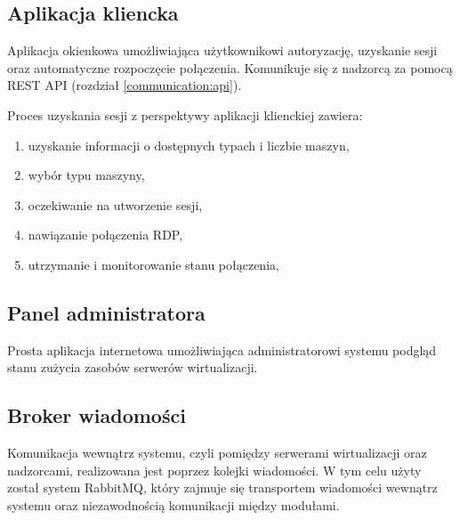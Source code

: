 \documentclass[../opis-rozwiazania.tex]{subfiles}
\begin{document}
\subsection{Aplikacja kliencka}
\label{modules:client}

Aplikacja okienkowa umożliwiająca użytkownikowi autoryzację, uzyskanie sesji oraz automatyczne rozpoczęcie połączenia. Komunikuje się z nadzorcą za pomocą REST API (rozdział \ref{communication:api}).

Proces uzyskania sesji z perspektywy aplikacji klienckiej zawiera:
\begin{enumerate}
  \item uzyskanie informacji o dostępnych typach i liczbie maszyn,
  \item wybór typu maszyny,
  \item oczekiwanie na utworzenie sesji,
  \item nawiązanie połączenia RDP,
  \item utrzymanie i monitorowanie stanu połączenia,
\end{enumerate}

\subsection{Panel administratora}

Prosta aplikacja internetowa umożliwiająca administratorowi systemu podgląd stanu zużycia zasobów serwerów wirtualizacji.

\subsection{Broker wiadomości}
\label{modules:broker}

Komunikacja wewnątrz systemu, czyli pomiędzy serwerami wirtualizacji oraz nadzorcami, realizowana jest  poprzez kolejki wiadomości. W tym celu użyty został system RabbitMQ, który zajmuje się transportem wiadomości wewnątrz systemu oraz niezawodnością komunikacji między modułami.
\end{document}
